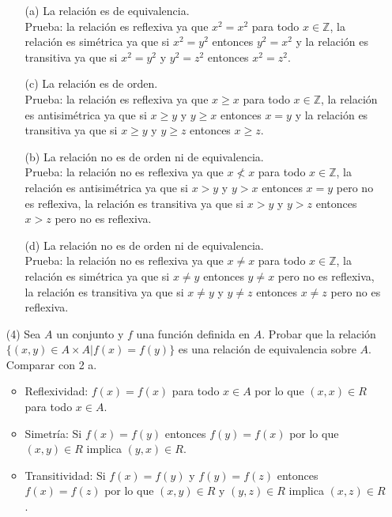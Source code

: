 \documentclass[10pt]{article}
\begin{document}
\begin{enumerate}
\begin{sol}
        \begin{enumerate}
            \item [(a)] La relación es de equivalencia. \\
            Prueba: la relación es reflexiva ya que $x^{2}=x^{2}$ para todo $x \in \mathbb{Z}$, la relación es simétrica ya que si $x^{2}=y^{2}$ entonces $y^{2}=x^{2}$ y la relación es transitiva ya que si $x^{2}=y^{2}$ y $y^{2}=z^{2}$ entonces $x^{2}=z^{2}$.
            \item [(c)] La relación es de orden. \\
            Prueba: la relación es reflexiva ya que $x \geq x$ para todo $x \in \mathbb{Z}$, la relación es antisimétrica ya que si $x \geq y$ y $y \geq x$ entonces $x=y$ y la relación es transitiva ya que si $x \geq y$ y $y \geq z$ entonces $x \geq z$.
            \item [(b)] La relación no es de orden ni de equivalencia. \\
            Prueba: la relación no es reflexiva ya que $x \nless x$ para todo $x \in \mathbb{Z}$, la relación es antisimétrica ya que si $x > y$ y $y > x$ entonces $x=y$ pero no es reflexiva, la relación es transitiva ya que si $x > y$ y $y > z$ entonces $x > z$ pero no es reflexiva.
            \item [(d)] La relación no es de orden ni de equivalencia. \\
            Prueba: la relación no es reflexiva ya que $x \neq x$ para todo $x \in \mathbb{Z}$, la relación es simétrica ya que si $x \neq y$ entonces $y \neq x$ pero no es reflexiva, la relación es transitiva ya que si $x \neq y$ y $y \neq z$ entonces $x \neq z$ pero no es reflexiva.
        \end{enumerate}
    \end{sol}
    \item[(4)] Sea $A$ un conjunto y $f$ una función definida en $A$. Probar que la relación $\{(x, y) \in A \times A | f(x)=f(y)\}$ es una relación de equivalencia sobre $A$. Comparar con 2 a.
    \begin{sol}
        \begin{itemize}
            \item Reflexividad: $f(x)=f(x)$ para todo $x \in A$ por lo que $(x, x) \in R$ para todo $x \in A$.
            \item Simetría: Si $f(x)=f(y)$ entonces $f(y)=f(x)$ por lo que $(x, y) \in R$ implica $(y, x) \in R$.
            \item Transitividad: Si $f(x)=f(y)$ y $f(y)=f(z)$ entonces $f(x)=f(z)$ por lo que $(x, y) \in R$ y $(y, z) \in R$ implica $(x, z) \in R$.

\end{itemize}
\end{sol}
\end{enumerate}
\end{document}
